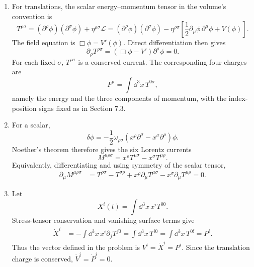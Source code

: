 \begin{enumerate}
\begin{enumerate}
Noether's first theorem takes a differentiable action symmetry to an
on-shell conserved current; it assumes the variational equations and
keeps track of any boundary term in the action variation.  A conserved
local current gives a conserved charge only with suitable boundary
conditions.  Conversely, a charge gives a symmetry when it is a
well-defined canonical generator, for example
\(\delta\phi=\ii\epsilon[Q,\phi]\), and conservation is equivalent to
\([Q,H]=0\) when the charge has no explicit time dependence.  An inverse
Noether statement from a current to a local variational symmetry also
requires a regular local action and is understood modulo identically
conserved improvement currents.  These qualifications are why none of
the three implications is purely formal.
\item
For translations, the scalar energy--momentum tensor in the volume's
convention is
\[
 T^{\rho\sigma}
 =(\partial^\rho\phi)(\partial^\sigma\phi)
  +\eta^{\rho\sigma}\mathcal L
 =(\partial^\rho\phi)(\partial^\sigma\phi)
  -\eta^{\rho\sigma}\left[
    \frac12\partial_\mu\phi\,\partial^\mu\phi+V(\phi)\right].
\]
The field equation is \(\Box\phi=V'(\phi)\).  Direct differentiation
then gives
\[
 \partial_\rho T^{\rho\sigma}
 =(\Box\phi-V')\partial^\sigma\phi=0.
\]
For each fixed \(\sigma\), \(T^{\rho\sigma}\) is a conserved current.
The corresponding four charges are
\[
 P^\sigma=\int \dd^3x\,T^{0\sigma},
\]
namely the energy and the three components of momentum, with the
index-position signs fixed as in Section 7.3.
\item
For a scalar,
\[
 \delta\phi
 =-\frac12\omega_{\rho\sigma}
  (x^\rho\partial^\sigma-x^\sigma\partial^\rho)\phi.
\]
Noether's theorem therefore gives the six Lorentz currents
\[
 M^{\mu\rho\sigma}
 =x^\rho T^{\mu\sigma}-x^\sigma T^{\mu\rho}.
\]
Equivalently, differentiating and using symmetry of the scalar tensor,
\[
\begin{split}
 \partial_\mu M^{\mu\rho\sigma}
 &=T^{\rho\sigma}-T^{\sigma\rho}
   +x^\rho\partial_\mu T^{\mu\sigma}
   -x^\sigma\partial_\mu T^{\mu\rho}=0.
\end{split}
\]
\item
Let
\[
 X^i(t)=\int \dd^3x\,x^iT^{00}.
\]
Stress-tensor conservation and vanishing surface terms give
\[
\begin{split}
 \dot X^i
 &=-\int \dd^3x\,x^i\partial_jT^{j0}
   =\int \dd^3x\,T^{i0}
   =\int \dd^3x\,T^{0\ii}=P^i.
\end{split}
\]
Thus the vector defined in the problem is
\(V^i=\dot X^i=P^i\).  Since the translation charge is conserved,
\(\dot V^i=\dot P^i=0\).
\end{enumerate}


\end{enumerate}
